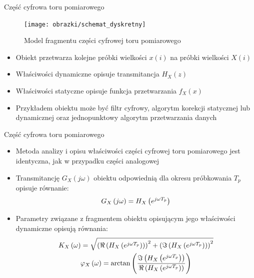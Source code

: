 \documentclass[12pt, polish, aspectratio = 169]{beamer}
\begin{document}
\begin{frame}{Część cyfrowa toru pomiarowego}
\begin{figure}
\texttt{[image: obrazki/schemat\_dyskretny]}
\caption{Model fragmentu części cyfrowej toru pomiarowego}
\end{figure}
\begin{itemize}
\item Obiekt przetwarza kolejne próbki wielkości $x(i)$ na próbki wielkości $X(i)$
\item Właściwości dynamiczne opisuje transmitancja $H_{X}(z)$
\item Właściwości statyczne opisuje funkcja przetwarzania $f_{X}(x)$
\item Przykładem obiektu może być filtr cyfrowy, algorytm korekcji statycznej lub dynamicznej oraz jednopunktowy algorytm przetwarzania danych
\end{itemize}
\end{frame}

\begin{frame}{Część cyfrowa toru pomiarowego}
\begin{itemize}
\item Metoda analizy i opisu właściwości części cyfrowej toru pomiarowego jest identyczna, jak w przypadku części analogowej
\item Transmitancję $G_{X}(j\omega)$ obiektu odpowiednią dla okresu próbkowania $T_{p}$ opisuje równanie:
\begin{equation}
G_{X} \left(j\omega\right) = H_{X} \left(e^{j\omega T_{p}}\right) \label{eq:trans_disc_tocont}
\end{equation}
\item Parametry związane z fragmentem obiektu opisującym jego właściwości dynamiczne opisują równania:
\begin{gather}
K_{X} \left(\omega\right) = \sqrt{\left( \Re \left( H_{X} \left(e^{j\omega T_{p}}\right) \right) \right)^{2} + \left( \Im \left( H_{X} \left(e^{j\omega T_{p}}\right) \right) \right)^{2}} \label{eq:mid_disc_amp} \\
\varphi_{X} \left(\omega\right) = \arctan \left( \frac{\Im \left( H_{X} \left(e^{j\omega T_{p}}\right) \right)}{\Re \left( H_{X} \left(e^{j\omega T_{p}}\right) \right)} \right) \label{eq:mid_disc_phi}
\end{gather}
\end{itemize}
\end{frame}
\end{document}

